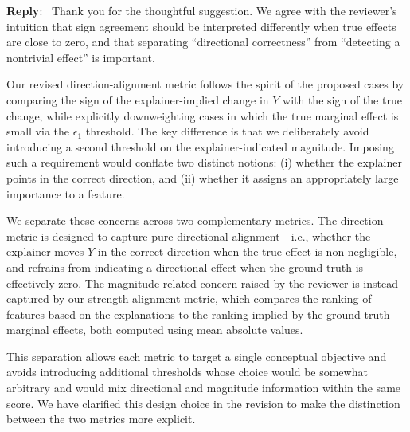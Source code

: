 \documentclass[11pt]{article}
\newcounter{se}[section]
\newcounter{reviewer}
\newcounter{point}[reviewer]
\newenvironment{reply}
 {\par\medskip \noindent \begin{sf}\textbf{Reply}:\ }
 {\medskip \end{sf}}
\begin{document}
\begin{reply}
Thank you for the thoughtful suggestion. We agree with the reviewer’s intuition that sign agreement should be interpreted differently when true effects are close to zero, and that separating “directional correctness” from “detecting a nontrivial effect” is important.

Our revised direction-alignment metric follows the spirit of the proposed cases by comparing the sign of the explainer-implied change in $Y$ with the sign of the true change, while explicitly downweighting cases in which the true marginal effect is small via the $\epsilon_1$ threshold. The key difference is that we deliberately avoid introducing a second threshold on the explainer-indicated magnitude. Imposing such a requirement would conflate two distinct notions: (i) whether the explainer points in the correct direction, and (ii) whether it assigns an appropriately large importance to a feature.

We separate these concerns across two complementary metrics. The direction metric is designed to capture pure directional alignment—i.e., whether the explainer moves $Y$ in the correct direction when the true effect is non-negligible, and refrains from indicating a directional effect when the ground truth is effectively zero. The magnitude-related concern raised by the reviewer is instead captured by our strength-alignment metric, which compares the ranking of features based on the explanations to the ranking implied by the ground-truth marginal effects, both computed using mean absolute values.

This separation allows each metric to target a single conceptual objective and avoids introducing additional thresholds whose choice would be somewhat arbitrary and would mix directional and magnitude information within the same score. We have clarified this design choice in the revision to make the distinction between the two metrics more explicit.



\end{reply}
\end{document}
